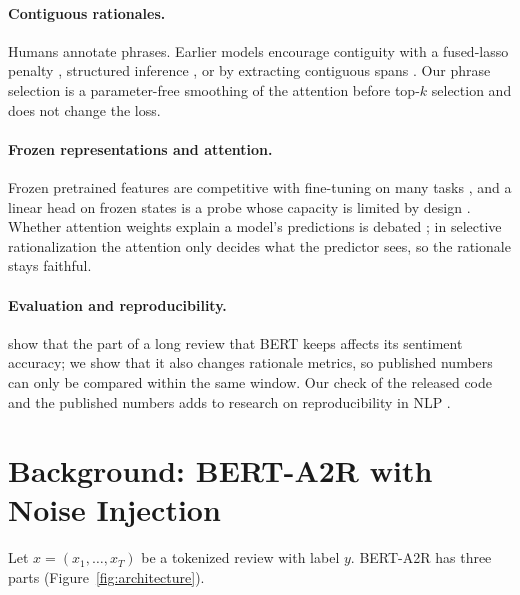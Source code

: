 \documentclass[11pt]{article}
\begin{document}
\paragraph{Contiguous rationales.}
Humans annotate phrases. Earlier models encourage contiguity with a fused-lasso penalty \citep{lei-etal-2016-rationalizing,bastings-etal-2019-interpretable}, structured inference \citep{guerreiro-martins-2021-spectra}, or by extracting contiguous spans \citep{jain-etal-2020-learning}. Our phrase selection is a parameter-free smoothing of the attention before top-$k$ selection and does not change the loss.

\paragraph{Frozen representations and attention.}
Frozen pretrained features are competitive with fine-tuning on many tasks \citep{peters-etal-2019-tune}, and a linear head on frozen states is a probe whose capacity is limited by design \citep{hewitt-liang-2019-designing}. Whether attention weights explain a model's predictions is debated \citep{jain-wallace-2019-attention,wiegreffe-pinter-2019-attention}; in selective rationalization the attention only decides what the predictor sees, so the rationale stays faithful.

\paragraph{Evaluation and reproducibility.}
\citet{sun2019finetune} show that the part of a long review that BERT keeps affects its sentiment accuracy; we show that it also changes rationale metrics, so published numbers can only be compared within the same window. Our check of the released code and the published numbers adds to research on reproducibility in NLP \citep{belz-etal-2021-systematic}.

\section{Background: BERT-A2R with Noise Injection}
\label{sec:background}

Let $x = (x_1, \dots, x_T)$ be a tokenized review with label $y$. BERT-A2R \citep{storek-etal-2023-unsupervised} has three parts (Figure~\ref{fig:architecture}).
\end{document}
